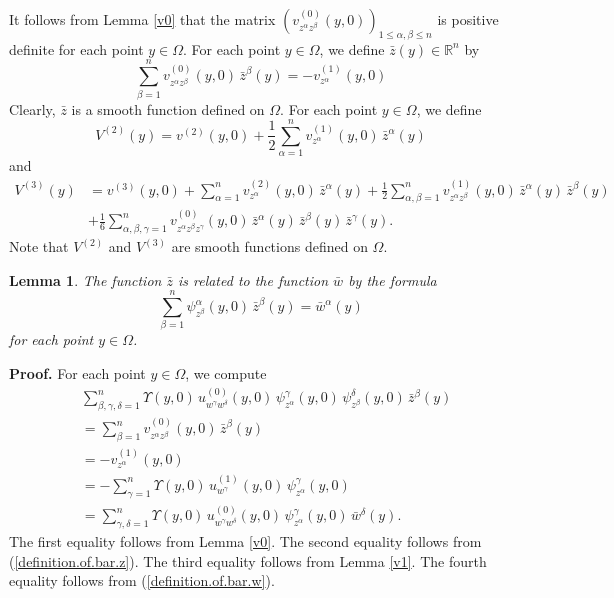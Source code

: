 \documentclass[11pt]{amsart}
\newtheorem{lemma}[theorem]{Lemma}
\theoremstyle{definition}
\begin{document}
It follows from Lemma \ref{v0} that the matrix $(v^{(0)}_{z^\alpha z^\beta}(y,0))_{1 \leq \alpha,\beta \leq n}$ is positive definite for each point $y \in \Omega$. For each point $y \in \Omega$, we define $\bar{z}(y) \in \mathbb{R}^n$ by 
\begin{equation} 
\label{definition.of.bar.z}
\sum_{\beta=1}^n v^{(0)}_{z^\alpha z^\beta}(y,0) \, \bar{z}^\beta(y) = -v^{(1)}_{z^\alpha}(y,0) 
\end{equation}
Clearly, $\bar{z}$ is a smooth function defined on $\Omega$. For each point $y \in \Omega$, we define 
\[V^{(2)}(y) = v^{(2)}(y,0) + \frac{1}{2} \sum_{\alpha=1}^n v^{(1)}_{z^\alpha}(y,0) \, \bar{z}^\alpha(y)\] 
and 
\begin{align*} 
V^{(3)}(y) 
&= v^{(3)}(y,0) + \sum_{\alpha=1}^n v^{(2)}_{z^\alpha}(y,0) \, \bar{z}^\alpha(y) + \frac{1}{2} \sum_{\alpha,\beta=1}^n v^{(1)}_{z^\alpha z^\beta}(y,0) \, \bar{z}^\alpha(y) \, \bar{z}^\beta(y) \\ 
&+ \frac{1}{6} \sum_{\alpha,\beta,\gamma=1}^n v^{(0)}_{z^\alpha z^\beta z^\gamma}(y,0) \, \bar{z}^\alpha(y) \, \bar{z}^\beta(y) \, \bar{z}^\gamma(y). 
\end{align*}
Note that $V^{(2)}$ and $V^{(3)}$ are smooth functions defined on $\Omega$.


\begin{lemma}
\label{relation.between.bar.w.and.bar.z}
The function $\bar{z}$ is related to the function $\bar{w}$ by the formula 
\[\sum_{\beta=1}^n \psi^\alpha_{z^\beta}(y,0) \, \bar{z}^\beta(y) = \bar{w}^\alpha(y)\] 
for each point $y \in \Omega$.
\end{lemma}

\textbf{Proof.} 
For each point $y \in \Omega$, we compute 
\begin{align*} 
&\sum_{\beta,\gamma,\delta=1}^n \Upsilon(y,0) \, u^{(0)}_{w^\gamma w^\delta}(y,0) \, \psi^\gamma_{z^\alpha}(y,0) \, \psi^\delta_{z^\beta}(y,0) \, \bar{z}^\beta(y) \\ 
&= \sum_{\beta=1}^n v^{(0)}_{z^\alpha z^\beta}(y,0) \, \bar{z}^\beta(y) \\ 
&= -v^{(1)}_{z^\alpha}(y,0) \\ 
&= -\sum_{\gamma=1}^n \Upsilon(y,0) \, u^{(1)}_{w^\gamma}(y,0) \, \psi^\gamma_{z^\alpha}(y,0) \\ 
&= \sum_{\gamma,\delta=1}^n \Upsilon(y,0) \, u^{(0)}_{w^\gamma w^\delta}(y,0) \, \psi^\gamma_{z^\alpha}(y,0) \, \bar{w}^\delta(y). 
\end{align*} 
The first equality follows from Lemma \ref{v0}. The second equality follows from (\ref{definition.of.bar.z}). The third equality follows from Lemma \ref{v1}. The fourth equality follows from (\ref{definition.of.bar.w}). 
\end{document}
